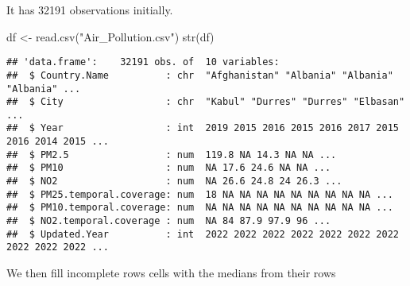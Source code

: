 \documentclass[
]{article}
\newenvironment{Shaded}{\begin{snugshade}}{\end{snugshade}}
\newcommand{\FunctionTok}[1]{\textcolor[rgb]{0.00,0.00,0.00}{#1}}
\newcommand{\NormalTok}[1]{#1}
\newcommand{\OtherTok}[1]{\textcolor[rgb]{0.56,0.35,0.01}{#1}}
\newcommand{\StringTok}[1]{\textcolor[rgb]{0.31,0.60,0.02}{#1}}
\begin{document}
It has 32191 observations initially.

\begin{Shaded}
\begin{Highlighting}[]
\NormalTok{df }\OtherTok{\textless{}{-}} \FunctionTok{read.csv}\NormalTok{(}\StringTok{"Air\_Pollution.csv"}\NormalTok{)}
\FunctionTok{str}\NormalTok{(df)}
\end{Highlighting}
\end{Shaded}

\begin{verbatim}
## 'data.frame':    32191 obs. of  10 variables:
##  $ Country.Name          : chr  "Afghanistan" "Albania" "Albania" "Albania" ...
##  $ City                  : chr  "Kabul" "Durres" "Durres" "Elbasan" ...
##  $ Year                  : int  2019 2015 2016 2015 2016 2017 2015 2016 2014 2015 ...
##  $ PM2.5                 : num  119.8 NA 14.3 NA NA ...
##  $ PM10                  : num  NA 17.6 24.6 NA NA ...
##  $ NO2                   : num  NA 26.6 24.8 24 26.3 ...
##  $ PM25.temporal.coverage: num  18 NA NA NA NA NA NA NA NA NA ...
##  $ PM10.temporal.coverage: num  NA NA NA NA NA NA NA NA NA NA ...
##  $ NO2.temporal.coverage : num  NA 84 87.9 97.9 96 ...
##  $ Updated.Year          : int  2022 2022 2022 2022 2022 2022 2022 2022 2022 2022 ...
\end{verbatim}

We then fill incomplete rows cells with the medians from their rows
\end{document}
